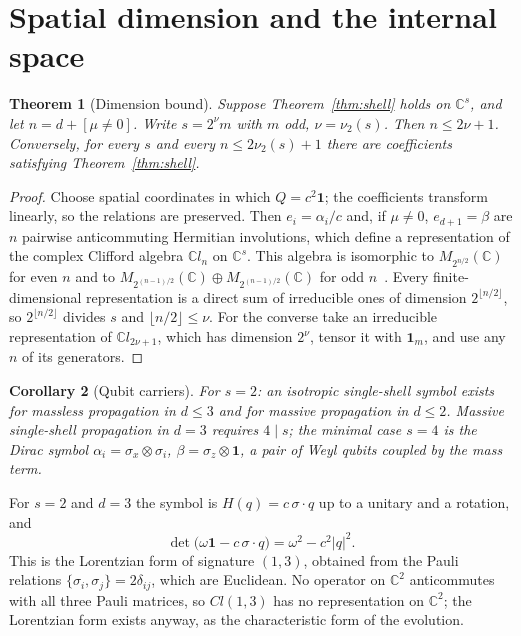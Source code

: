 \documentclass[12pt]{article}
\newtheorem{theorem}{Theorem}
\newtheorem{corollary}[theorem]{Corollary}
\theoremstyle{definition}
\theoremstyle{remark}
\begin{document}
\section{Spatial dimension and the internal space}
\label{sec:dimension}

\begin{theorem}[Dimension bound]
\label{thm:dimension}
Suppose Theorem~\ref{thm:shell} holds on $\mathbb C^s$, and let $n=d+[\mu\neq0]$. Write $s=2^{\nu}m$ with $m$ odd, $\nu=\nu_2(s)$. Then $n\le2\nu+1$. Conversely, for every $s$ and every $n\le2\nu_2(s)+1$ there are coefficients satisfying Theorem~\ref{thm:shell}.
\end{theorem}

\begin{proof}
Choose spatial coordinates in which $Q=c^2\mathbf 1$; the coefficients transform linearly, so the relations are preserved. Then $e_i=\alpha_i/c$ and, if $\mu\ne0$, $e_{d+1}=\beta$ are $n$ pairwise anticommuting Hermitian involutions, which define a representation of the complex Clifford algebra $\mathbb{C}l_n$ on $\mathbb C^s$. This algebra is isomorphic to $M_{2^{n/2}}(\mathbb C)$ for even $n$ and to $M_{2^{(n-1)/2}}(\mathbb C)\oplus M_{2^{(n-1)/2}}(\mathbb C)$ for odd $n$~\cite{LawsonMichelsohn1989}. Every finite-dimensional representation is a direct sum of irreducible ones of dimension $2^{\lfloor n/2\rfloor}$, so $2^{\lfloor n/2\rfloor}$ divides $s$ and $\lfloor n/2\rfloor\le\nu$. For the converse take an irreducible representation of $\mathbb{C}l_{2\nu+1}$, which has dimension $2^\nu$, tensor it with $\mathbf 1_m$, and use any $n$ of its generators.
\end{proof}

\begin{corollary}[Qubit carriers]
\label{cor:qubit}
For $s=2$: an isotropic single-shell symbol exists for massless propagation in $d\le3$ and for massive propagation in $d\le2$. Massive single-shell propagation in $d=3$ requires $4\mid s$; the minimal case $s=4$ is the Dirac symbol $\alpha_i=\sigma_x\otimes\sigma_i$, $\beta=\sigma_z\otimes\mathbf 1$, a pair of Weyl qubits coupled by the mass term.
\end{corollary}

For $s=2$ and $d=3$ the symbol is $H(q)=c\,\sigma\cdot q$ up to a unitary and a rotation, and
\begin{equation}
\det\bigl(\omega\mathbf 1-c\,\sigma\cdot q\bigr)=\omega^2-c^2|q|^2 .
\label{eq:weyl}
\end{equation}
This is the Lorentzian form of signature $(1,3)$, obtained from the Pauli relations $\{\sigma_i,\sigma_j\}=2\delta_{ij}$, which are Euclidean. No operator on $\mathbb C^2$ anticommutes with all three Pauli matrices, so $Cl(1,3)$ has no representation on $\mathbb C^2$; the Lorentzian form exists anyway, as the characteristic form of the evolution.
\end{document}
